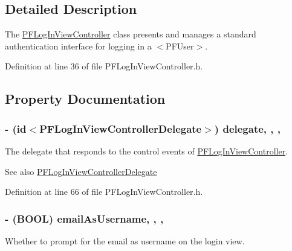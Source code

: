 \subsection{Detailed Description}
The {\ttfamily \hyperlink{interface_p_f_log_in_view_controller}{P\+F\+Log\+In\+View\+Controller}} class presents and manages a standard authentication interface for logging in a $<$\+P\+F\+User$>$. 

Definition at line 36 of file P\+F\+Log\+In\+View\+Controller.\+h.



\subsection{Property Documentation}
\hypertarget{interface_p_f_log_in_view_controller_aee5f26d00a8aa4fa970c0ee8edf18e5b}{}
\subsubsection[{delegate}]{\setlength{\rightskip}{0pt plus 5cm}-\/ (id$<${\bf P\+F\+Log\+In\+View\+Controller\+Delegate}$>$) delegate\hspace{0.3cm}{\ttfamily [read]}, {\ttfamily [write]}, {\ttfamily [nonatomic]}, {\ttfamily [weak]}}\label{interface_p_f_log_in_view_controller_aee5f26d00a8aa4fa970c0ee8edf18e5b}
The delegate that responds to the control events of {\ttfamily \hyperlink{interface_p_f_log_in_view_controller}{P\+F\+Log\+In\+View\+Controller}}.

\begin{DoxySeeAlso}{See also}
\hyperlink{protocol_p_f_log_in_view_controller_delegate-p}{P\+F\+Log\+In\+View\+Controller\+Delegate} 
\end{DoxySeeAlso}


Definition at line 66 of file P\+F\+Log\+In\+View\+Controller.\+h.

\hypertarget{interface_p_f_log_in_view_controller_a26e4396d8e549640b53d2ec74d7f4a55}{}
\subsubsection[{email\+As\+Username}]{\setlength{\rightskip}{0pt plus 5cm}-\/ (B\+O\+O\+L) email\+As\+Username\hspace{0.3cm}{\ttfamily [read]}, {\ttfamily [write]}, {\ttfamily [nonatomic]}, {\ttfamily [assign]}}\label{interface_p_f_log_in_view_controller_a26e4396d8e549640b53d2ec74d7f4a55}
Whether to prompt for the email as username on the login view.

